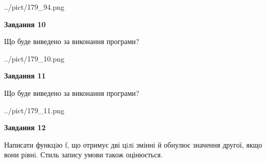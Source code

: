 \documentclass[12pt, ukrainian]{article}
\begin{document}
{\begin {large}
\begin{center}
	{../pict/179_94.png}
\end{center}
\newpage

{\begin {center}\textbf{Завдання 10}\end {center}}

Що буде виведено за виконання програми?\par
\begin{center}
	{../pict/179_10.png}
\end{center}
\newpage

{\begin {center}\textbf{Завдання 11}\end {center}}

Що буде виведено за виконання програми?\par
\begin{center}
	{../pict/179_11.png}
\end{center}
\newpage

{\begin {center}\textbf{Завдання 12}\end {center}}


Написати функцiю f, що отримує дві цiлi змінні й обнулює значення другої, якщо вони рiвнi. Стиль запису умови також оцінюється.\par
\newpage

\end {large}}
\end{document}

